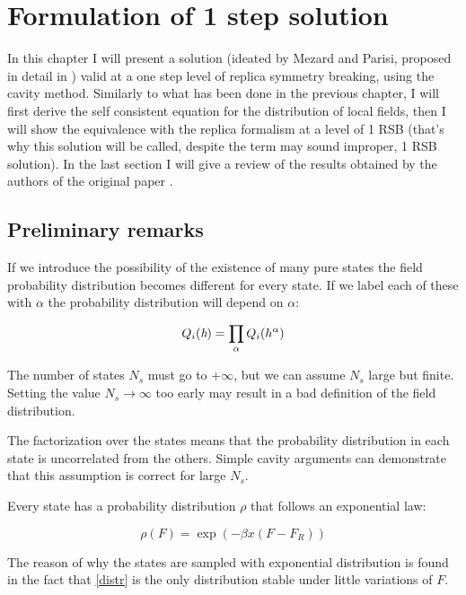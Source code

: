 \chapter{Formulation of 1 step solution}

In this chapter I will present a solution (ideated by Mezard and Parisi, proposed in detail in \cite{bethe}) valid at a one step level of replica symmetry breaking, using the cavity method. Similarly to what has been done in the previous chapter, I will first derive the self consistent equation for the distribution of local fields, then I will show the equivalence with the replica formalism at a level of 1 RSB (that's why this solution will be called, despite the term may sound improper, 1 RSB solution). In the last section I will give a review of the results obtained by the authors of the original paper \cite{bethe}.

\section{Preliminary remarks}
If we introduce the possibility of the existence of many pure states the field probability distribution becomes different for every state. If we label each of these with $\alpha$ the probability distribution will depend on $\alpha$:

\begin{equation}
Q_i(\emph{h}) = \prod_\alpha Q_i(h^\alpha)
\end{equation}

The number of states $N_s$ must go to $+\infty$, but we can assume $N_s$ large but finite. Setting the value $N_s \rightarrow \infty$ too early may result in a bad definition of the field distribution.

The factorization over the states means that the probability distribution in each state is uncorrelated from the others. Simple cavity arguments can demonstrate that this assumption is correct for large $N_s$.

Every state has a probability distribution $\rho$ that follows an exponential law:

\begin{equation}
\rho(F) = \exp(-\beta x (F-F_R))
\label{distr}
\end{equation}

The reason of why the states are sampled with exponential distribution is found in the fact that \ref{distr} is the only distribution stable under little variations of $F$.

